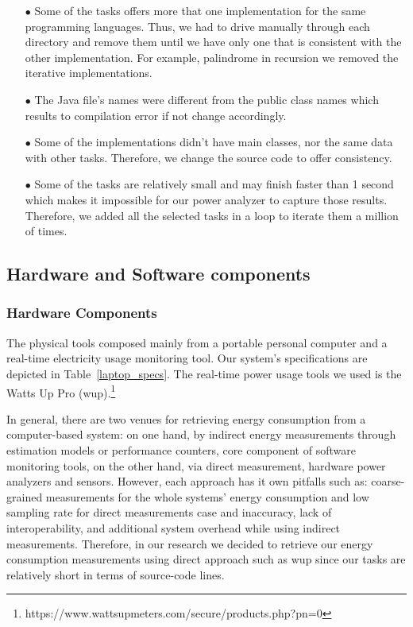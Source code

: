 \begin{enumerate}
	\item [$\bullet$] Some of the tasks offers more that one implementation 
	for the same programming languages. 
	Thus, we had to drive manually through each directory and remove 
	them until we have only one that is consistent with the other 
	implementation. 
	For example, palindrome in recursion we removed the iterative 
	implementations. 
	\item [$\bullet$] The Java file's names were 
	different from the public class names which results to compilation 
	error if not change accordingly. 
	\item [$\bullet$] Some of the implementations didn't have main 
	classes, nor the same data with other tasks. 
	Therefore, we change the source code to offer consistency.
	\item [$\bullet$] Some of the tasks are relatively small and may 
	finish faster than 1 second which makes it impossible for our 
	power analyzer to capture those results. 
	Therefore, we added all the selected tasks in a loop to iterate them 
	a million of times. 
\end{enumerate}


\subsection{Hardware and Software components}

\subsubsection{Hardware Components}
The physical tools composed mainly from a portable personal 
computer and a real-time electricity usage monitoring tool.
Our system's specifications are depicted in Table~\ref{laptop_specs}. 
The real-time power usage tools we used is the Watts Up Pro ({\sc wup}).\footnote{https://www.wattsupmeters.com/secure/products.php?pn=0} 

In general, there are two venues for retrieving energy consumption 
from a computer-based system: on one hand, by indirect energy measurements 
through estimation models or performance counters, core component 
of software monitoring tools, on the other hand, via direct measurement, 
hardware power analyzers and sensors.  
However, each approach has it own pitfalls such as: coarse-grained 
measurements for the whole systems' energy consumption and low sampling 
rate for direct measurements case and inaccuracy, lack of interoperability, 
and additional system overhead while using indirect measurements. 
Therefore, in our research we decided to retrieve our energy consumption 
measurements using direct approach such as {\sc wup} since our 
tasks are relatively short in terms of source-code lines.

